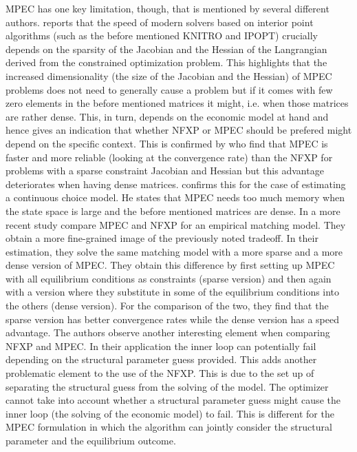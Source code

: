MPEC has one key limitation, though, that is mentioned by several different authors. \cite{Wright.2004} reports that the speed of modern solvers based on interior point algorithms (such as the before mentioned KNITRO and IPOPT) crucially depends on the sparsity of the Jacobian and the Hessian of the Langrangian derived from the constrained optimization problem. This highlights that the increased dimensionality (the size of the Jacobian and the Hessian) of MPEC problems does not need to generally cause a problem but if it comes with few zero elements in the before mentioned matrices it might, i.e. when those matrices are rather dense. This, in turn, depends on the economic model at hand and hence gives an indication that whether NFXP or MPEC should be prefered might depend on the specific context. This is confirmed by \citeauthor{Dube.Fox.Su.2012} who find that MPEC is faster and more reliable (looking at the convergence rate) than the NFXP for problems with a sparse constraint Jacobian and Hessian but this advantage deteriorates when having dense matrices. \cite{Jorgensen.2013} confirms this for the case of estimating a continuous choice model. He states that MPEC needs too much memory when the state space is large and the before mentioned matrices are dense. In a more recent study \cite{Dong.Hsieh.Zhang.2017} compare MPEC and NFXP for an empirical matching model. They obtain a more fine-grained image of the previously noted tradeoff. In their estimation, they solve the same matching model with a more sparse and a more dense version of MPEC. They obtain this difference by first setting up MPEC with all equilibrium conditions as constraints (sparse version) and then again with a version where they substitute in some of the equilibrium conditions into the others (dense version). For the comparison of the two, they find that the sparse version has better convergence rates while the dense version has a speed advantage. The authors observe another interesting element when comparing NFXP and MPEC. In their application the inner loop can potentially fail depending on the structural parameter guess provided. This adds another problematic element to the use of the NFXP. This is due to the set up of separating the structural guess from the solving of the model. The optimizer cannot take into account whether a structural parameter guess might cause the inner loop (the solving of the economic model) to fail. This is different for the MPEC formulation in which the algorithm can jointly consider the structural parameter and the equilibrium outcome.



